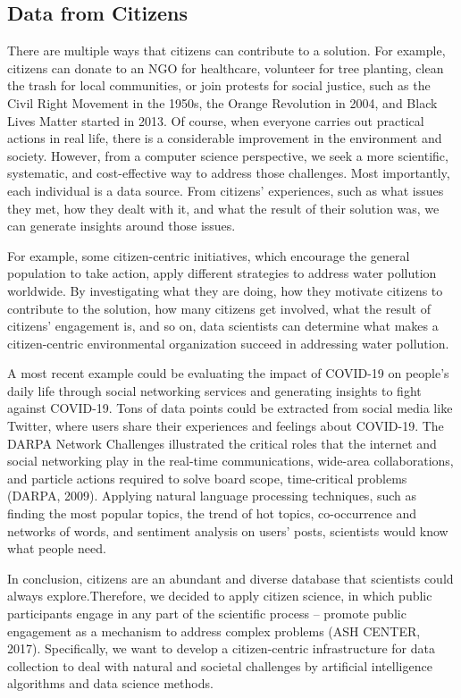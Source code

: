 \documentclass{ucsdreport}
\begin{document}
\subsection{Data from Citizens}
There are multiple ways that citizens can contribute to a solution. For 
example, citizens can donate to an NGO for healthcare, volunteer for tree 
planting, clean the trash for local communities, or join protests for social
justice, such as the Civil Right Movement in the 1950s, the Orange Revolution 
in 2004, and Black Lives Matter started in 2013. Of course, when everyone 
carries out practical actions in real life, there is a considerable improvement
in the environment and society. However, from a computer science perspective, 
we seek a more scientific, systematic, and cost-effective way to address those
challenges. Most importantly, each individual is a data source. From citizens' 
experiences, such as what issues they met, how they dealt with it, and what 
the result of their solution was, we can generate insights around those issues. 

For example, some citizen-centric initiatives, which encourage the general 
population to take action, apply different strategies to address water 
pollution worldwide. By investigating what they are doing, how they motivate 
citizens to contribute to the solution, how many citizens get involved, what 
the result of citizens' engagement is, and so on, data scientists can determine
what makes a citizen-centric environmental organization succeed in addressing
water pollution. 

A most recent example could be evaluating the impact of COVID-19 on people's 
daily life through social networking services and generating insights to fight
against COVID-19. Tons of data points could be extracted from social media 
like Twitter, where users share their experiences and feelings about COVID-19.
The DARPA Network Challenges illustrated the critical roles that the internet 
and social networking play in the real-time communications, wide-area 
collaborations, and particle actions required to solve board scope,
time-critical problems (DARPA, 2009).
Applying natural language processing techniques, such as finding the most 
popular topics, the trend of hot topics, co-occurrence and networks of words, 
and sentiment analysis on users' posts, scientists would know what people need. 

In conclusion, citizens are an abundant and diverse database that scientists
could always explore.Therefore, we decided to apply citizen science, in which 
public participants engage in any part of the scientific process -- promote
public engagement as a mechanism to address complex problems (ASH CENTER, 2017). 
Specifically, we want to develop a citizen-centric infrastructure for data
collection to deal with natural and societal challenges by  artificial 
intelligence algorithms and data science methods. 
\end{document}
